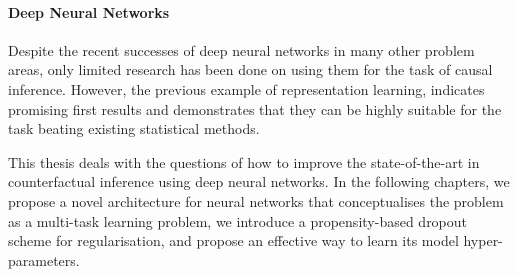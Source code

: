 \paragraph{Deep Neural Networks} 
Despite the recent successes of deep neural networks in many other problem areas, only limited research has been done on using them for the task of causal inference. However, the previous example of representation learning, %
indicates promising first results and demonstrates that they can be highly suitable for the task beating existing statistical methods.
 
%


This thesis deals with the questions of how to improve the state-of-the-art in counterfactual inference using deep neural networks. In the following chapters, we propose a novel architecture for neural networks that conceptualises the problem as a multi-task learning problem, we introduce a propensity-based dropout scheme for regularisation, and propose an effective way to learn its model hyper-parameters. 



